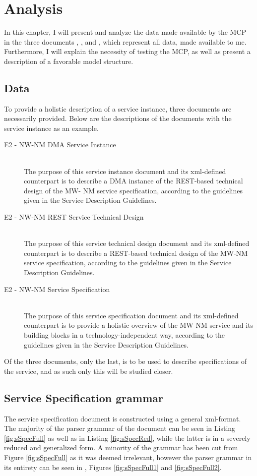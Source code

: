 \chapter{Analysis}

In this chapter, I will present and analyze the data made available by the MCP in the three documents , , and , which represent all data, made available to me. Furthermore, I will explain the necessity of testing the MCP, as well as present a description of a favorable model structure. 

\section{Data}

To provide a holistic description of a service instance, three documents are necessarily provided. Below are the descriptions of the documents with the service instance  as an example.
\begin{description}
	\item[E2 - NW-NM DMA Service Instance]\ \\
		The purpose of this service instance document and its xml-defined counterpart is to describe a DMA instance of the REST-based technical design of the MW- NM service specification, according to the guidelines given in the Service Description Guidelines.
	\item[E2 - NW-NM REST Service Technical Design]\ \\
		The purpose of this service technical design document and its xml-defined counterpart is to describe a REST-based technical design of the MW-NM service specification, according to the guidelines given in the Service Description Guidelines.
	\item[E2 - NW-NM Service Specification]\ \\
		The purpose of this service specification document and its xml-defined counterpart is to provide a holistic overview of the MW-NM service and its building blocks in a technology-independent way, according to the guidelines given in the Service Description Guidelines.
\end{description}
Of the three documents, only the last,  is to be used to describe specifications of the service, and as such only this will be studied closer.
\section{Service Specification grammar}
The service specification document is constructed using a general xml-format. The majority of the parser grammar of the document can be seen in Listing \ref{fig:sSpecFull} as well as in Listing \ref{fig:sSpecRed}, while the latter is in a severely reduced and generalized form. A minority of the grammar has been cut from Figure \ref{fig:sSpecFull} as it was deemed irrelevant, however the parser grammar in its entirety can be seen in , Figures \ref{fig:sSpecFull1} and \ref{fig:sSpecFull2}.

